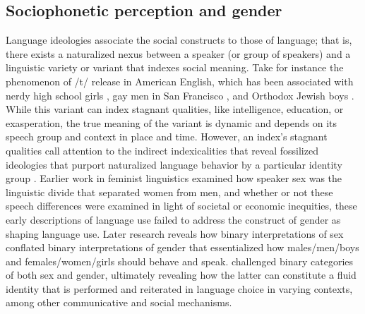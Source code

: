 \documentclass[output=paper,colorlinks,citecolor=brown]{langscibook}
\begin{document}
\subsection{Sociophonetic perception and gender}
Language ideologies associate the social constructs to those of language; that is, there exists a naturalized nexus between a speaker (or group of speakers) and a linguistic variety or variant \citep{gals95} that indexes social meaning. Take for instance the phenomenon of /t/ release in American English, which has been associated with nerdy high school girls \citep{buch01}, gay men in San Francisco \citep{pode06}, and Orthodox Jewish boys \citep{buni01}. While this variant can index stagnant qualities, like intelligence, education, or exasperation, the true meaning of the variant is dynamic and depends on its speech group and context in place and time. However, an index’s stagnant qualities call attention to the indirect indexicalities \citep{ochs90} that reveal fossilized ideologies that purport naturalized language behavior by a particular identity group \citep{ecke99}.  Earlier work in feminist linguistics examined how speaker sex was the linguistic divide that separated women from men, and whether or not these speech differences were examined in light of societal or economic inequities, these early descriptions of language use failed to address the construct of gender as shaping language use. Later research reveals how binary interpretations of sex conflated binary interpretations of gender that essentialized how males/men/boys and females/women/girls should behave and speak. \cite{butl02} challenged binary categories of both sex and gender, ultimately revealing how the latter can constitute a fluid identity that is performed and reiterated in language choice in varying contexts, among other communicative and social mechanisms.
\end{document}
